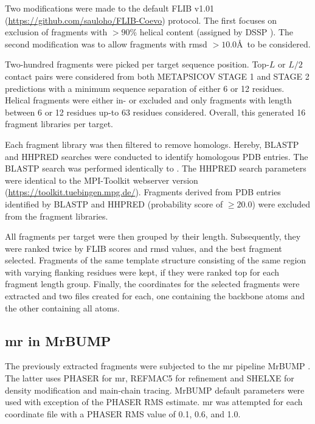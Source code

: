 Two modifications were made to the default FLIB v1.01 (\url{https://github.com/sauloho/FLIB-Coevo}) protocol. The first focuses on exclusion of fragments with $>90$\% helical content (assigned by DSSP \cite{Frishman1995-ns}). The second modification was to allow fragments with \gls{rmsd} $>10.0$\AA\ to be considered.

Two-hundred fragments were picked per target sequence position. Top-$L$ or $L/2$ contact pairs were considered from both METAPSICOV STAGE 1 and STAGE 2 predictions with a minimum sequence separation of either 6 or 12 residues. Helical fragments were either in- or excluded and only fragments with length between 6 or 12 residues up-to 63 residues considered. Overall, this generated 16 fragment libraries per target.

Each fragment library was then filtered to remove homologs. Hereby, BLASTP and HHPRED \cite{Soding2005-sx} searches were conducted to identify homologous PDB entries. The BLASTP search was performed identically to \cite{De_Oliveira2015-ba}. The HHPRED search parameters were identical to the MPI-Toolkit \cite{Biegert2006-ny} webserver version (\url{https://toolkit.tuebingen.mpg.de/}). Fragments derived from PDB entries identified by BLASTP and HHPRED (probability score of $\geq20.0$) were excluded from the fragment libraries.

All fragments per target were then grouped by their length. Subsequently, they were ranked twice by FLIB scores and \gls{rmsd} values, and the best fragment selected. Fragments of the same template structure consisting of the same region with varying flanking residues were kept, if they were ranked top for each fragment length group. Finally, the coordinates for the selected fragments were extracted and two files created for each, one containing the backbone atoms and the other containing all atoms.

\subsection{\acrlong{mr} in MrBUMP}
The previously extracted fragments were subjected to the \gls{mr} pipeline MrBUMP \cite{Keegan2008-hk}. The latter uses PHASER \cite{McCoy2007-bf} for \gls{mr}, REFMAC5 \cite{Murshudov2011-we} for refinement and SHELXE \cite{Thorn2013-ir} for density modification and main-chain tracing. MrBUMP default parameters were used with exception of the PHASER RMS estimate. \gls{mr} was attempted for each coordinate file with a PHASER RMS value of 0.1, 0.6, and 1.0.

